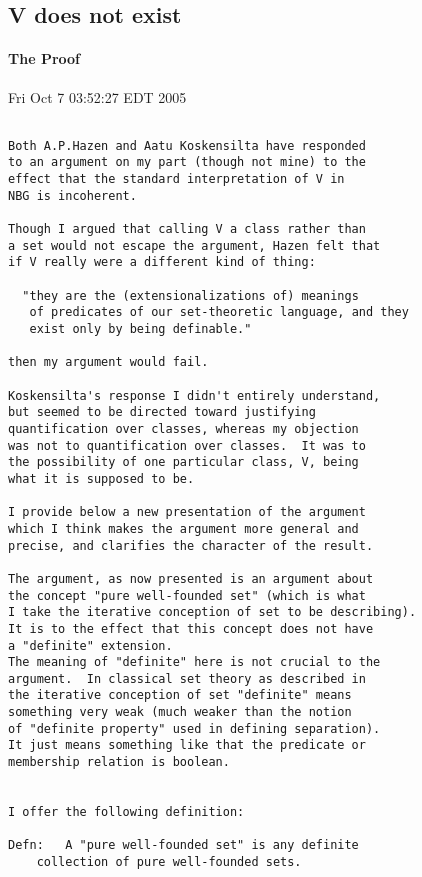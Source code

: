 \documentclass[numreferences]{rbjk}
\begin{document}
\begin{article}
\subsection{V does not exist}

\paragraph{The Proof}

Fri Oct 7 03:52:27 EDT 2005

\begin{verbatim}

Both A.P.Hazen and Aatu Koskensilta have responded
to an argument on my part (though not mine) to the
effect that the standard interpretation of V in
NBG is incoherent.

Though I argued that calling V a class rather than
a set would not escape the argument, Hazen felt that
if V really were a different kind of thing:

  "they are the (extensionalizations of) meanings
   of predicates of our set-theoretic language, and they 
   exist only by being definable."

then my argument would fail.

Koskensilta's response I didn't entirely understand,
but seemed to be directed toward justifying
quantification over classes, whereas my objection
was not to quantification over classes.  It was to
the possibility of one particular class, V, being
what it is supposed to be.

I provide below a new presentation of the argument
which I think makes the argument more general and
precise, and clarifies the character of the result.

The argument, as now presented is an argument about
the concept "pure well-founded set" (which is what
I take the iterative conception of set to be describing).
It is to the effect that this concept does not have
a "definite" extension.
The meaning of "definite" here is not crucial to the
argument.  In classical set theory as described in
the iterative conception of set "definite" means
something very weak (much weaker than the notion
of "definite property" used in defining separation).
It just means something like that the predicate or
membership relation is boolean.


I offer the following definition:

Defn:	A "pure well-founded set" is any definite
	collection of pure well-founded sets.


\end{verbatim}
\end{article}
\end{document}

